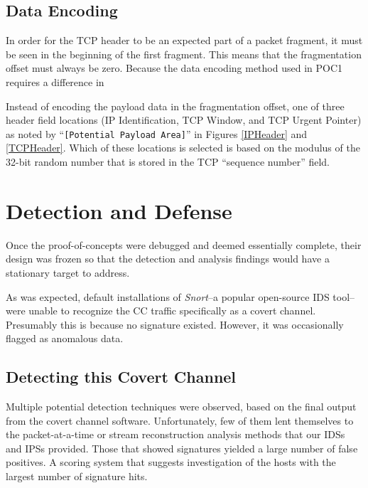 \documentclass[letterpaper,10pt,draft]{article}
\begin{document}
\subsection{Data Encoding}

In order for the TCP header to be an expected part of a packet
fragment, it must be seen in the beginning of the first fragment.
This means that the fragmentation offset must always be zero.  Because
the data encoding method used in POC1 requires a difference in 

Instead of encoding the payload data in the fragmentation offset, one
of three header field locations (IP Identification, TCP Window, and
TCP Urgent Pointer) as noted by ``\texttt{[Potential Payload Area]}'' in
Figures \ref{IPHeader} and \ref{TCPHeader}.  Which of these locations
is selected is based on the modulus of the 32-bit random number that
is stored in the TCP ``sequence number'' field.

\section{Detection and Defense}

Once the proof-of-concepts were debugged and deemed essentially
complete, their design was frozen so that the detection and
analysis findings would have a stationary target to address.

As was expected, default installations of \textit{Snort}--a popular
open-source IDS tool--were unable to recognize the CC traffic
specifically as a covert channel.  Presumably this is because 
no signature existed.  However, it was occasionally flagged as
anomalous data.

\subsection{Detecting this Covert Channel}
\label{Detection}

Multiple potential detection techniques were observed, based on the
final output from the covert channel software.  Unfortunately, few of
them lent themselves to the packet-at-a-time or stream reconstruction
analysis methods that our IDSs and IPSs provided.  Those that
showed signatures yielded a large number of false positives.  A
scoring system that suggests investigation of the hosts with the
largest number of signature hits.
\end{document}
